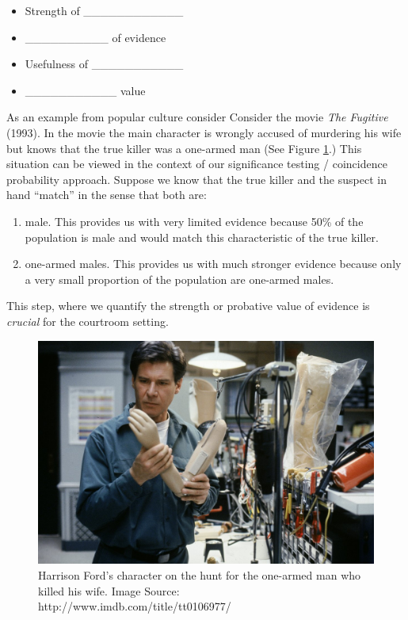 \documentclass[]{book}
\providecommand{\tightlist}{%
  \setlength{\itemsep}{0pt}\setlength{\parskip}{0pt}}
\theoremstyle{definition}
\theoremstyle{definition}
\theoremstyle{remark}
\begin{document}
\begin{itemize}
\tightlist
\item
  Strength of \_\_\_\_\_\_\_\_\_\_\_\_ \vspace{.1in}
\item
  \_\_\_\_\_\_\_\_\_\_ of evidence \vspace{.1in}
\item
  Usefulness of \_\_\_\_\_\_\_\_\_\_\_ \vspace{.1in}
\item
  \_\_\_\_\_\_\_\_\_\_\_ value
\end{itemize}

As an example from popular culture consider Consider the movie \emph{The
Fugitive} (1993). In the movie the main character is wrongly accused of
murdering his wife but knows that the true killer was a one-armed man
(See Figure \ref{fig:fugitive}.) This situation can be viewed in the
context of our significance testing / coincidence probability approach.
Suppose we know that the true killer and the suspect in hand ``match''
in the sense that both are:

\begin{enumerate}
\def\labelenumi{\arabic{enumi}.}
\tightlist
\item
  male. This provides us with very limited evidence because 50\% of the
  population is male and would match this characteristic of the true
  killer.
\item
  one-armed males. This provides us with much stronger evidence because
  only a very small proportion of the population are one-armed males.
\end{enumerate}

This step, where we quantify the strength or probative value of evidence
is \emph{crucial} for the courtroom setting.

\begin{figure}[h]

{\centering \includegraphics[width=.5\linewidth]{img/thefugitive} 

}

\caption{Harrison Ford's character on the hunt for the one-armed man who killed his wife. Image Source: http://www.imdb.com/title/tt0106977/}\label{fig:fugitive}
\end{figure}
\end{document}
